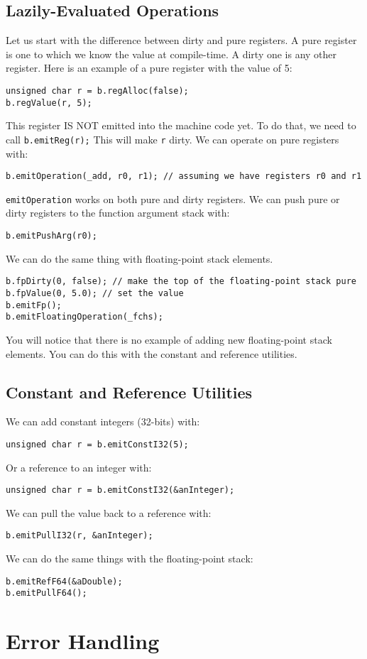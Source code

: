 \documentclass[10pt,a4paper]{article}
\begin{document}
\subsection{Lazily-Evaluated Operations}
Let us start with the difference between dirty and pure registers. A pure register is one to which we know the value at compile-time. A dirty one is any other register. Here is an example of a pure register with the value of 5:
\begin{verbatim}
unsigned char r = b.regAlloc(false);
b.regValue(r, 5);
\end{verbatim}

This register IS NOT emitted into the machine code yet. To do that, we need to call \verb|b.emitReg(r);| This will make \verb|r| dirty. We can operate on pure registers with:
\begin{verbatim}
b.emitOperation(_add, r0, r1); // assuming we have registers r0 and r1
\end{verbatim}

\verb|emitOperation| works on both pure and dirty registers. We can push pure or dirty registers to the function argument stack with:
\begin{verbatim}
b.emitPushArg(r0);
\end{verbatim}

We can do the same thing with floating-point stack elements.
\begin{verbatim}
b.fpDirty(0, false); // make the top of the floating-point stack pure
b.fpValue(0, 5.0); // set the value
b.emitFp();
b.emitFloatingOperation(_fchs);
\end{verbatim}

You will notice that there is no example of adding new floating-point stack elements. You can do this with the constant and reference utilities.

\subsection{Constant and Reference Utilities}
We can add constant integers (32-bits) with:
\begin{verbatim}
unsigned char r = b.emitConstI32(5);
\end{verbatim}

Or a reference to an integer with:
\begin{verbatim}
unsigned char r = b.emitConstI32(&anInteger);
\end{verbatim}

We can pull the value back to a reference with:
\begin{verbatim}
b.emitPullI32(r, &anInteger);
\end{verbatim}

We can do the same things with the floating-point stack:
\begin{verbatim}
b.emitRefF64(&aDouble);
b.emitPullF64();
\end{verbatim}

\section{Error Handling}
\end{document}
